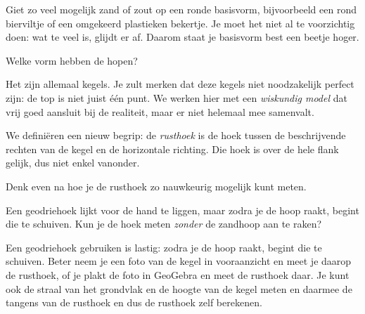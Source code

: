 \documentclass{ximera}
\begin{document}
\author{Alexander Holvoet}

Giet zo veel mogelijk zand of zout op een ronde basisvorm, bijvoorbeeld een rond
bierviltje of een omgekeerd plastieken bekertje. Je moet het niet al te voorzichtig doen:
wat te veel is, glijdt er af. Daarom staat je basisvorm best een beetje hoger.

\begin{exercise}
    Welke vorm hebben de hopen?
    \begin{oplossing}
        Het zijn allemaal kegels. Je zult merken dat deze kegels niet noodzakelijk perfect
        zijn: de top is niet juist \'e\'en punt. We werken hier met een \textit{wiskundig
        model} dat vrij goed aansluit bij de realiteit, maar er niet helemaal mee samenvalt.
    \end{oplossing}
\end{exercise}

We definiëren een nieuw begrip: de \emph{rusthoek} is de hoek tussen de beschrijvende
rechten van de kegel en de horizontale richting. Die hoek is over de hele flank gelijk,
dus niet enkel vanonder.


\begin{exercise}
    Denk even na hoe je de rusthoek zo nauwkeurig mogelijk kunt meten.
    \begin{hint}
        Een geodriehoek lijkt voor de hand te liggen, maar zodra je de hoop raakt, begint
        die te schuiven. Kun je de hoek meten \emph{zonder} de zandhoop aan te raken?
    \end{hint}
    \begin{oplossing}
        Een geodriehoek gebruiken is lastig: zodra je de hoop raakt, begint die te schuiven.
        Beter neem je een foto van de kegel in vooraanzicht en meet je daarop de rusthoek,
        of je plakt de foto in GeoGebra en meet de rusthoek daar. Je kunt ook de straal
        van het grondvlak en de hoogte van de kegel meten en daarmee de tangens van de
        rusthoek \textemdash{} en dus de rusthoek zelf \textemdash{} berekenen.
    \end{oplossing}
\end{exercise}

\end{document}
